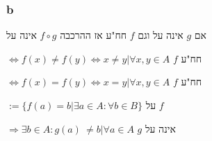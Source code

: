 \documentclass{article}
\begin{document}
\subsubsection*{b}

\begin{ntp}
    אם $g$ אינה על וגם $f$ 
    חח"ע
    אז ההרכבה $ f \circ g $
    אינה על
\end{ntp}

\begin{define}
    $ \iff f(x) \not = f(y) \iff x \not = y | \forall x, y \in A $
    $f$ חח"ע
\end{define}

\begin{sen}
    $ \iff f(x) = f(y) \iff x = y | \forall x, y \in A $
    $f$ חח"ע
\end{sen}

\begin{define}
    $ := \{ f(a) = b | \exists a \in A : \forall b \in B \} $
    על $f$
\end{define}

\begin{remark}
    $ \Rightarrow \exists b \in A : g(a) \
    \not = b | \forall a \in A $
    $g$ אינה על
\end{remark}
\end{document}
